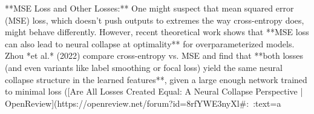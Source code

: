 **MSE Loss and Other Losses:** One might suspect that mean squared error (MSE) loss, which doesn’t push outputs to extremes the way cross-entropy does, might behave differently. However, recent theoretical work shows that **MSE loss can also lead to neural collapse at optimality** for overparameterized models. Zhou *et al.* (2022) compare cross-entropy vs. MSE and find that **both losses (and even variants like label smoothing or focal loss) yield the same neural collapse structure in the learned features**, given a large enough network trained to minimal loss ([Are All Losses Created Equal: A Neural Collapse Perspective | OpenReview](https://openreview.net/forum?id=8rfYWE3nyXl#:~:text=a%

